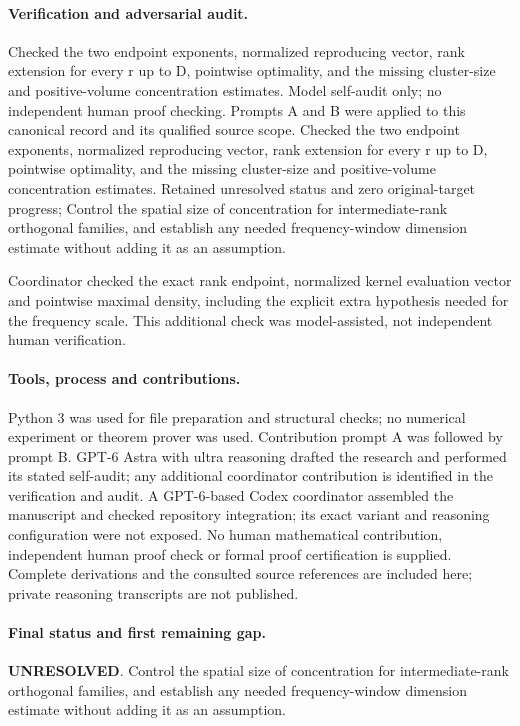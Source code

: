 \documentclass[11pt]{article}
\begin{document}
\paragraph{Verification and adversarial audit.}
Checked the two endpoint exponents, normalized reproducing vector, rank extension for every r up to D, pointwise optimality, and the missing cluster-size and positive-volume concentration estimates. Model self-audit only; no independent human proof checking. Prompts A and B were applied to this canonical record and its qualified source scope. Checked the two endpoint exponents, normalized reproducing vector, rank extension for every r up to D, pointwise optimality, and the missing cluster-size and positive-volume concentration estimates. Retained unresolved status and zero original-target progress; Control the spatial size of concentration for intermediate-rank orthogonal families, and establish any needed frequency-window dimension estimate without adding it as an assumption.

Coordinator checked the exact rank endpoint, normalized kernel evaluation vector and pointwise maximal density, including the explicit extra hypothesis needed for the frequency scale. This additional check was model-assisted, not independent human verification.

\paragraph{Tools, process and contributions.}
Python 3 was used for file preparation and structural checks; no numerical experiment or theorem prover was used. Contribution prompt A was followed by prompt B. GPT-6 Astra with ultra reasoning drafted the research and performed its stated self-audit; any additional coordinator contribution is identified in the verification and audit. A GPT-6-based Codex coordinator assembled the manuscript and checked repository integration; its exact variant and reasoning configuration were not exposed. No human mathematical contribution, independent human proof check or formal proof certification is supplied. Complete derivations and the consulted source references are included here; private reasoning transcripts are not published.

\paragraph{Final status and first remaining gap.}
\textbf{UNRESOLVED}. Control the spatial size of concentration for intermediate-rank orthogonal families, and establish any needed frequency-window dimension estimate without adding it as an assumption.
\end{document}
